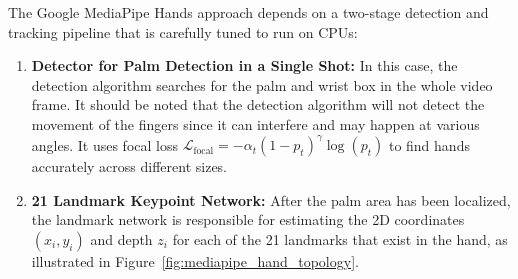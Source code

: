 The Google MediaPipe Hands approach \cite{Zhang2020MediaPipe} depends on a two-stage detection and tracking pipeline that is carefully tuned to run on CPUs:
\begin{enumerate}
    \item \textbf{Detector for Palm Detection in a Single Shot:} In this case, the detection algorithm searches for the palm and wrist box in the whole video frame. It should be noted that the detection algorithm will not detect the movement of the fingers since it can interfere and may happen at various angles. It uses focal loss $\mathcal{L}_{\text{focal}} = -\alpha_t (1 - p_t)^\gamma \log(p_t)$ to find hands accurately across different sizes.
    \item \textbf{21 Landmark Keypoint Network:} After the palm area has been localized, the landmark network is responsible for estimating the 2D coordinates $(x_i, y_i)$ and depth $z_i$ for each of the 21 landmarks that exist in the hand, as illustrated in Figure~\ref{fig:mediapipe_hand_topology}.
\end{enumerate}

